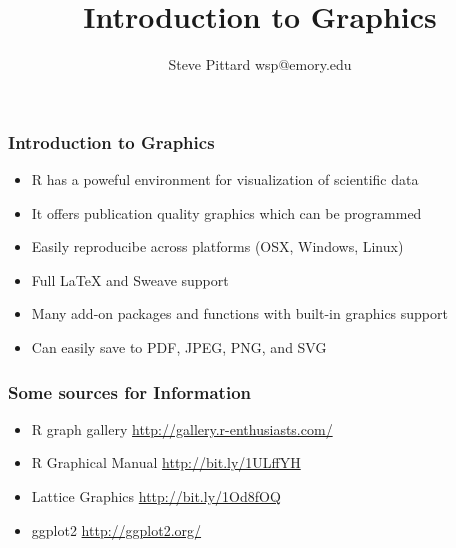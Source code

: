 \documentclass[xcolor=table]{beamer}
\begin{document}

% 


\title{Introduction to Graphics}
\subtitle{Steve Pittard wsp@emory.edu}

\maketitle




\begin{frame}[fragile]
\frametitle{Introduction to Graphics}
\begin{itemize}
\item R has a poweful environment for visualization of scientific data
\item It offers publication quality graphics which can be programmed
\item Easily reproducibe across platforms (OSX, Windows, Linux)
\item Full LaTeX and Sweave support
\item Many add-on packages and functions with built-in graphics support 
\item Can easily save to PDF, JPEG, PNG, and SVG
\end{itemize}
\end{frame}

%

\begin{frame}[fragile]
\frametitle{Some sources for Information}
\begin{itemize}
\item R graph gallery \url{http://gallery.r-enthusiasts.com/}
\item R Graphical Manual \url{http://bit.ly/1ULffYH}
\item Lattice Graphics \url{http://bit.ly/1Od8fOQ}
\item ggplot2 \url{http://ggplot2.org/}
\end{itemize}
\end{frame}

%
\end{document}
